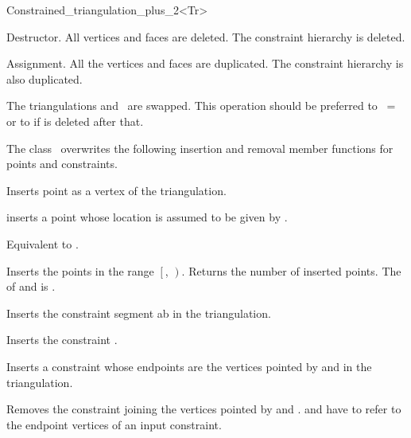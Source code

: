 \begin{ccRefClass}{Constrained_triangulation_plus_2<Tr>}
{
{Destructor. All vertices and faces are deleted.
The constraint hierarchy is deleted.}




{Assignment. All the vertices and faces are duplicated.
 The constraint hierarchy is also duplicated.}

{The triangulations  and \ccVar\ are swapped.
This operation should be preferred to \ccVar\ =  or to
 if  is deleted after that.}

The class \ccRefName\ overwrites the following insertion and removal
member functions for points and constraints.

{Inserts point  as a vertex of the triangulation.}

{inserts a point  whose location is assumed 
to be given by .}

{Equivalent to .}

{Inserts the points in the range
 $\left[\right.$, $\left.\right)$.
 Returns the number of inserted points.
 \ccPrecond The  of  and 
 is .}

{Inserts the constraint segment ab in the triangulation. }

{Inserts the constraint .}

{ Inserts a constraint whose endpoints are the vertices 
pointed by  and  in the triangulation. }

{Removes the constraint  joining the vertices pointed by  and .
\ccPrecond {} and  have to refer to  the endpoint vertices
of an  input constraint.}


}
\end{ccRefClass}

